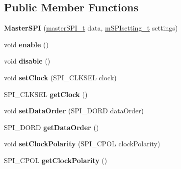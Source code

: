 \subsection*{Public Member Functions}
\begin{DoxyCompactItemize}
\item 
\mbox{\label{classMasterSPI_abfc56edf4c6f5c60d8f55f4c4a579c75}} 
{\bfseries Master\+S\+PI} (\hyperlink{structmasterSPI__t}{master\+S\+P\+I\+\_\+t} data, \hyperlink{structmSPIsetting__t}{m\+S\+P\+Isetting\+\_\+t} settings)
\item 
\mbox{\label{classMasterSPI_a1e141d3c600973a7fbc20295fd848166}} 
void {\bfseries enable} ()
\item 
\mbox{\label{classMasterSPI_adae97af990eca4566cec849cb39dd0fc}} 
void {\bfseries disable} ()
\item 
\mbox{\label{classMasterSPI_a9bdb983b346cc4b03eac1ef30dfc8686}} 
void {\bfseries set\+Clock} (S\+P\+I\+\_\+\+C\+L\+K\+S\+EL clock)
\item 
\mbox{\label{classMasterSPI_a21f2d0bfe737d96f628bd70ea7b6514d}} 
S\+P\+I\+\_\+\+C\+L\+K\+S\+EL {\bfseries get\+Clock} ()
\item 
\mbox{\label{classMasterSPI_a566f067a1e45eea6705d0973c4cf8862}} 
void {\bfseries set\+Data\+Order} (S\+P\+I\+\_\+\+D\+O\+RD data\+Order)
\item 
\mbox{\label{classMasterSPI_af65dc8e666dacce098002f25d8154e4b}} 
S\+P\+I\+\_\+\+D\+O\+RD {\bfseries get\+Data\+Order} ()
\item 
\mbox{\label{classMasterSPI_a7bd208fd11af5254a31acd9ac17aedcf}} 
void {\bfseries set\+Clock\+Polarity} (S\+P\+I\+\_\+\+C\+P\+OL clock\+Polarity)
\item 
\mbox{\label{classMasterSPI_abe36df23759ef1ac4ceabf8beb0c87e1}} 
S\+P\+I\+\_\+\+C\+P\+OL {\bfseries get\+Clock\+Polarity} ()
\item 
\mbox{\label{classMasterSPI_af62130860321f5d56dbef942ed4dd976}} 

\end{DoxyCompactItemize}
